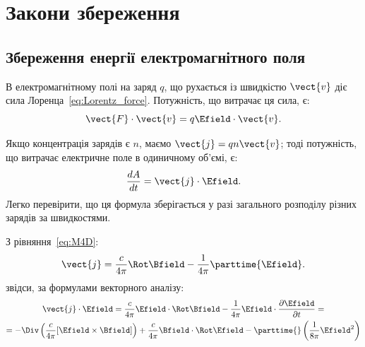 \section{Закони збереження}

\subsection*{Збереження енергії електромагнітного поля}

В електромагнітному полі на заряд $q$, що рухається із швидкістю $\vect{v}$ діє сила Лоренца~\eqref{eq:Lorentz_force}.
Потужність, що витрачає ця сила, є:
\begin{equation*}
	\vect{F}\cdot\vect{v} = q\Efield\cdot\vect{v}.
\end{equation*}

Якщо концентрація зарядів є $n$, маємо $\vect{j} = qn\vect{v}$; тоді потужність, що витрачає електричне поле в
одиничному об'ємі, є:
\begin{equation}
	\frac{dA}{dt} = \vect{j}\cdot\Efield.
\end{equation}
Легко перевірити, що ця формула зберігається у разі загального розподілу різних зарядів за швидкостями.

З рівняння~\eqref{eq:M4D}:
\begin{equation*}
	\vect{j} = \frac{c}{4\pi} \Rot\Bfield - \frac1{4\pi} \parttime{\Efield}.
\end{equation*}
звідси, за формулами векторного аналізу:
\begin{multline*}
	\vect{j}\cdot\Efield =  \frac{c}{4\pi}\Efield\cdot\Rot\Bfield - \frac1{4\pi}\Efield\cdot\frac{\partial\Efield}{\partial t} = \\
	= - \Div\left(\frac{c}{4\pi}[\Efield\times\Bfield]\right) + \frac{c}{4\pi}  \Bfield\cdot \Rot\Efield  -
	\parttime{}
	\left( \frac1{8\pi}\Efield^2\right)
\end{multline*}

